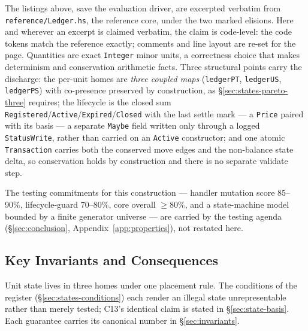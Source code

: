 \begin{remark}
The listings above, save the evaluation driver, are excerpted verbatim from
\texttt{reference/\allowbreak Ledger.hs}, the reference core, under the two marked
elisions. Here and wherever an excerpt is claimed verbatim, the claim is code-level:
the code tokens match the reference exactly; comments and line layout are re-set for
the page.
Quantities are exact \texttt{Integer} minor units, a correctness choice that makes
determinism and conservation arithmetic facts. Three structural points carry the
discharge: the per-unit homes are \emph{three coupled maps} (\texttt{ledgerPT}, \texttt{ledgerUS},
\texttt{ledgerPS}) with co-presence preserved by construction, as
\S\ref{sec:states-pareto-three} requires; the lifecycle is the closed sum
\texttt{Registered}/\texttt{Active}/\texttt{Expired}/\texttt{Closed} with the last settle
mark --- a \texttt{Price} paired with its basis --- a separate \texttt{Maybe} field written
only through a logged \texttt{StatusWrite}, rather than carried on an \texttt{Active}
constructor; and one atomic \texttt{Transaction}
carries both the conserved move edges and the non-balance state delta, so conservation holds
by construction and there is no separate validate step.
\end{remark}

The testing commitments for this construction --- handler mutation score 85--90\%,
lifecycle-guard 70--80\%, core overall $\geq80\%$, and a state-machine model bounded by a
finite generator universe --- are carried by the testing agenda
(\S\ref{sec:conclusion}, Appendix~\ref{app:properties}), not restated here.

\subsection*{Key Invariants and Consequences}

Unit state lives in three homes under one placement rule. The conditions of the register
(\S\ref{sec:states-conditions}) each render an illegal state unrepresentable rather than
merely tested; C13's identical claim is stated in \S\ref{sec:state-basis}.
Each guarantee carries its canonical number in \S\ref{sec:invariants}.

